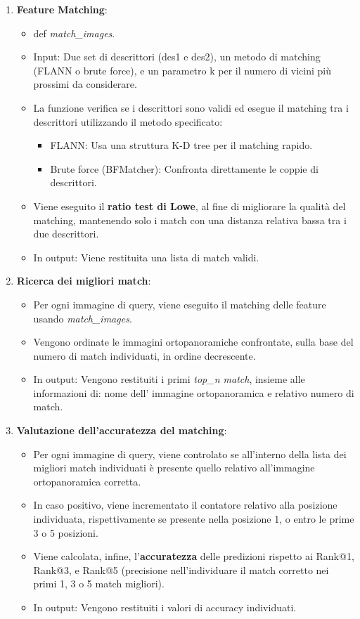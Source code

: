 \documentclass[12pt,a4paper,openright,twoside]{book}
\begin{document}
\begin{enumerate}
\item \textbf{Feature Matching}:
\begin{itemize}
\item def {\itshape match\_images}.
\item Input: Due set di descrittori (des1 e des2), un metodo di matching (FLANN o brute force), e un parametro k per il numero di vicini più prossimi da considerare.
\item La funzione verifica se i descrittori sono validi ed esegue il matching tra i descrittori utilizzando il metodo specificato:
\begin{itemize}
\item FLANN: Usa una struttura K-D tree per il matching rapido.
\item Brute force (BFMatcher): Confronta direttamente le coppie di descrittori.
\end{itemize}
\item Viene eseguito il \textbf{ratio test di Lowe}, al fine di migliorare la qualità del matching, mantenendo solo i match con una distanza relativa bassa tra i due descrittori.
\item In output: Viene restituita una lista di match validi.
\end{itemize}

\item \textbf{Ricerca dei migliori match}:
\begin{itemize}
\item Per ogni immagine di query, viene eseguito il matching delle feature usando {\itshape match\_images}.
\item Vengono ordinate le immagini ortopanoramiche confrontate, sulla base del numero di match individuati, in ordine decrescente.
\item In output: Vengono restituiti i primi {\itshape top\_n match}, insieme alle informazioni di: nome dell' immagine ortopanoramica e relativo numero di match.
\end{itemize}

\item \textbf{Valutazione dell'accuratezza del matching}:
\begin{itemize}
\item Per ogni immagine di query, viene controlato se all'interno della lista dei migliori match individuati è presente quello relativo all'immagine ortopanoramica corretta.
\item In caso positivo, viene incrementato il contatore relativo alla posizione individuata, rispettivamente se presente nella posizione 1, o entro le prime 3 o 5 posizioni.
\item Viene calcolata, infine, l'\textbf{accuratezza} delle predizioni rispetto ai Rank@1, Rank@3, e Rank@5 (precisione nell'individuare il match corretto nei primi 1, 3 o 5 match migliori).
\item In output: Vengono restituiti i valori di accuracy individuati.
\end{itemize}
\end{enumerate}
\end{document}
